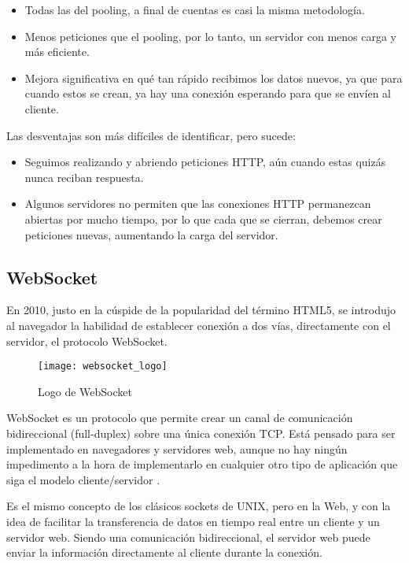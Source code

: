 \begin{itemize}
  \item Todas las del pooling, a final de cuentas es casi la misma metodología.
  \item Menos peticiones que el pooling, por lo tanto, un servidor con menos carga y más eficiente.
  \item Mejora significativa en qué tan rápido recibimos los datos nuevos, ya que para cuando estos se crean, ya hay una conexión esperando para que se envíen al cliente.
\end{itemize}

Las desventajas son más difíciles de identificar, pero sucede:

\begin{itemize}
  \item Seguimos realizando y abriendo peticiones HTTP, aún cuando estas quizás nunca reciban respuesta.
  \item Algunos servidores no permiten que las conexiones HTTP permanezcan abiertas por mucho tiempo, por lo que cada que se cierran, debemos crear peticiones nuevas, aumentando la carga del servidor.
\end{itemize}

\subsection{WebSocket}

En 2010, justo en la cúspide de la popularidad del término HTML5, se introdujo al navegador la habilidad de establecer conexión a dos vías, directamente con el servidor, el protocolo WebSocket.

\begin{figure}[htp!]
  \centering
  \texttt{[image: websocket\_logo]}
  \caption{Logo de WebSocket}
  \label{fig:websocket_logo}
\end{figure}

WebSocket es un protocolo que permite crear un canal de comunicación bidireccional (full-duplex) sobre una única conexión TCP. Está pensado para ser implementado en navegadores y servidores web, aunque no hay ningún impedimento a la hora de implementarlo en cualquier otro tipo de aplicación que siga el modelo cliente/servidor \cite{ws1}.

Es el mismo concepto de los clásicos sockets de UNIX, pero en la Web, y con la idea de facilitar la transferencia de datos en tiempo real entre un cliente y un servidor web. Siendo una comunicación bidireccional, el servidor web puede enviar la información directamente al cliente durante la conexión.

